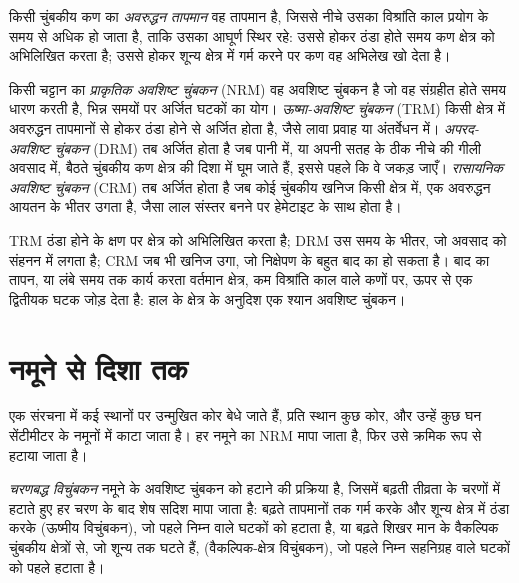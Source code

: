 \begin{definition}[अवरुद्धन तापमान]\label{def:b3:palaeomagnetism:blocking}
किसी चुंबकीय कण का \emph{अवरुद्धन तापमान} वह तापमान है,
जिससे नीचे उसका विश्रांति काल प्रयोग के समय से अधिक हो जाता है,
ताकि उसका आघूर्ण स्थिर रहे: उससे होकर ठंडा होते समय कण क्षेत्र को अभिलिखित करता है;
उससे होकर शून्य क्षेत्र में गर्म करने पर कण
वह अभिलेख खो देता है।
\end{definition}

\begin{definition}\label{def:b3:palaeomagnetism:nrm}
किसी चट्टान का \emph{प्राकृतिक अवशिष्ट चुंबकन}
(NRM) वह अवशिष्ट चुंबकन है जो वह संग्रहीत होते समय धारण करती है, भिन्न समयों पर
अर्जित घटकों का योग। \emph{ऊष्मा-अवशिष्ट
चुंबकन} (TRM) किसी क्षेत्र में अवरुद्धन तापमानों से होकर
ठंडा होने से अर्जित होता है, जैसे लावा प्रवाह या
अंतर्वेधन में। \emph{अपरद-अवशिष्ट चुंबकन}
(DRM) तब अर्जित होता है जब पानी में, या अपनी सतह के ठीक नीचे की गीली अवसाद में, बैठते चुंबकीय कण
क्षेत्र की दिशा में घूम जाते हैं, इससे पहले कि वे
जकड़ जाएँ। \emph{रासायनिक अवशिष्ट चुंबकन}
(CRM) तब अर्जित होता है जब कोई चुंबकीय खनिज किसी क्षेत्र में, एक
अवरुद्धन आयतन के भीतर उगता है, जैसा लाल संस्तर बनने पर हेमेटाइट के साथ होता है।
\end{definition}

TRM ठंडा होने के क्षण पर क्षेत्र को अभिलिखित करता है; DRM उस समय के भीतर, जो
अवसाद को संहनन में लगता है; CRM जब भी खनिज उगा, जो
निक्षेपण के बहुत बाद का हो सकता है। बाद का तापन, या लंबे समय तक कार्य करता वर्तमान क्षेत्र,
कम विश्रांति काल वाले कणों पर, ऊपर से एक द्वितीयक घटक जोड़ देता है:
हाल के क्षेत्र के अनुदिश एक श्यान अवशिष्ट चुंबकन।

\section{नमूने से दिशा तक}

एक संरचना में कई स्थानों पर उन्मुखित कोर बेधे जाते हैं,
प्रति स्थान कुछ कोर, और उन्हें कुछ घन सेंटीमीटर के नमूनों में काटा जाता है। हर नमूने का NRM
मापा जाता है, फिर उसे क्रमिक रूप से हटाया जाता है।

\begin{definition}\label{def:b3:palaeomagnetism:demag}
\emph{चरणबद्ध विचुंबकन} नमूने के अवशिष्ट चुंबकन को हटाने की
प्रक्रिया है, जिसमें बढ़ती तीव्रता के चरणों में हटाते हुए हर चरण के बाद शेष सदिश मापा जाता है:
बढ़ते तापमानों तक गर्म करके और
शून्य क्षेत्र में ठंडा करके (ऊष्मीय विचुंबकन), जो पहले निम्न  वाले घटकों को हटाता है, या
बढ़ते शिखर मान के वैकल्पिक चुंबकीय क्षेत्रों से, जो शून्य तक घटते हैं,
(वैकल्पिक-क्षेत्र विचुंबकन), जो पहले निम्न सहनिग्रह वाले
घटकों को पहले हटाता है।
\end{definition}


